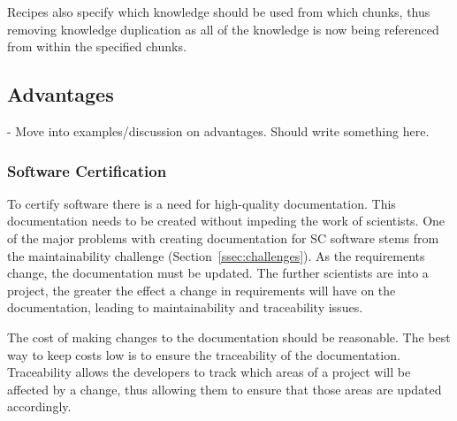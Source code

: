 \documentclass{sig-alternate-05-2015}
\begin{document}
Recipes also specify which knowledge should be used from which chunks, thus
removing knowledge duplication as all of the knowledge is now being referenced
from within the specified chunks.


\subsection{Advantages} \label{ssec:advantages}

- Move into examples/discussion on advantages. Should write something here.

\subsubsection{Software Certification} \label{sssec:adv_cert}


To certify software there is a need for high-quality documentation. This
documentation needs to be created without impeding the work of scientists. One
of the major problems with creating documentation for SC software stems from the
maintainability challenge (Section~\ref{ssec:challenges}). As the requirements
change, the documentation must be updated. The further scientists are into a
project, the greater the effect a change in requirements will have on the
documentation, leading to maintainability and traceability issues.

The cost of making changes to the documentation should be reasonable. The best
way to keep costs low is to ensure the traceability of the documentation.
Traceability allows the developers to track which areas of a project will be
affected by a change, thus allowing them to ensure that those areas are updated
accordingly.
\end{document}

